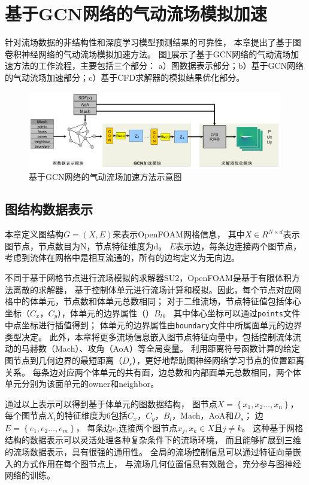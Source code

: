 \section{基于GCN网络的气动流场模拟加速}

针对流场数据的非结构性和深度学习模型预测结果的可靠性，
本章提出了基于图卷积神经网络的气动流场模拟加速方法。
图\ref{fig:gcnflow}展示了基于GCN网络的气动流场加速方法的工作流程，主要包括三个部分：
a）图数据表示部分；b）基于GCN网络的气动流场加速部分；c）基于CFD求解器的模拟结果优化部分。

\begin{figure}[htp]
	\centering
	\includegraphics[width=0.99\textwidth]{figures/data/architecture2.pdf}
	\caption{基于GCN网络的气动流场加速方法示意图}
	\label{fig:gcnflow}
\end{figure}


\subsection{图结构数据表示}

本章定义图结构$G=\left(X, E\right)$来表示OpenFOAM网格信息，
其中$X \in R^{N \times d}$表示图节点，节点数目为N，节点特征维度为d。
$E$表示边，每条边连接两个图节点，考虑到流体在网格中是相互流通的，所有的边均定义为无向边。

不同于基于网格节点进行流场模拟的求解器SU2\cite{2015SU2}，OpenFOAM是基于有限体积方法离散的求解器，
基于控制体单元进行流场计算和模拟。因此，每个节点对应网格中的体单元，节点数和体单元总数相同；
对于二维流场，节点特征值包括体心坐标（$C_x$，$C_y$），体单元的边界属性（）$B_l$。
其中体心坐标可以通过\texttt{points}文件中点坐标进行插值得到；
体单元的边界属性由\texttt{boundary}文件中所属面单元的边界类型决定。
此外，本章将更多流场信息嵌入图节点特征向量中，包括控制流体流动的马赫数（Mach）、攻角（AoA）等全局变量。
利用距离符号函数计算的给定图节点到几何边界的最短距离（$D_s$），更好地帮助图神经网络学习节点的位置距离关系。
每条边对应两个体单元的共有面，边总数和内部面单元总数相同，两个体单元分别为该面单元的owner和neighbor。

通过以上表示可以得到基于体单元的图数据结构，
图节点$X=\left\{x_1, x_2 \ldots, x_n \right\}$，
每个图节点$X_i$的特征维度为6包括$C_x$，$C_y$，$B_l$，Mach，AoA和$D_s$；
边$E = \left\{e_1, e_2 \ldots, e_m \right\}$，
每条边$e_i$连接两个图节点$x_j,x_k \in X$且$j\not= k$。
这种基于网格结构的数据表示可以灵活处理各种复杂条件下的流场环境，
而且能够扩展到三维的流场数据表示，具有很强的通用性。
全局的流场控制信息可以通过特征向量嵌入的方式作用在每个图节点上，
与流场几何位置信息有效融合，充分参与图神经网络的训练。

